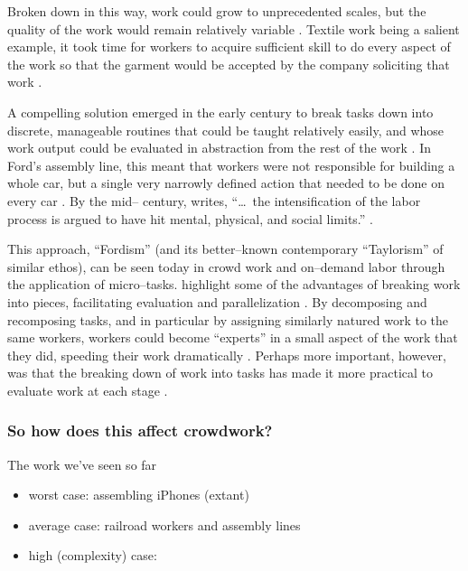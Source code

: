 \documentclass[trackingWork]{subfiles}
\begin{document}
Broken down in this way, work could grow to unprecedented scales,
but the quality of the work would remain relatively variable
\cite{murray1983decentralisation}.
Textile work being a salient example,
it took time for workers to acquire sufficient skill
to do every aspect of the work so that the garment would be accepted by the company soliciting that work
\cite{vezina1992light}.

A compelling solution emerged in the early  century to break tasks down into discrete,
manageable routines that could be taught relatively easily,
and whose work output could be evaluated in abstraction from the rest of the work
\cite{restructuringPieceworkBaker}.
In Ford's assembly line, this meant that workers were not responsible for building a whole car,
but a single very narrowly defined action that needed to be done on every car
\cite{towardsGlobalFordism}.
By the mid-- century, \citeauthor{schoenberger1988fordism} writes,
``\dots~the intensification of the labor process is argued to have hit mental, physical, and social limits.''
\cite{schoenberger1988fordism}.

This approach, ``Fordism'' (and its better--known contemporary ``Taylorism'' of similar ethos),
can be seen today in crowd work and on--demand labor through the application of micro--tasks.
\citeauthor{writingMicroTasks} highlight some of the advantages of breaking work into pieces,
facilitating evaluation and parallelization
\cite{writingMicroTasks}.
By decomposing and recomposing tasks,
and in particular by assigning similarly natured work to the same workers,
workers could become ``experts'' in a small aspect of the work that they did,
speeding their work dramatically
\cite{delayAndOrderLasecki}.
Perhaps more important, however, was that
the breaking down of work into tasks has made it more practical to evaluate work at each stage
\cite{rogstadius2011assessment}.

\subsubsection{So how does this affect crowdwork?}
The work we've seen so far 
\begin{itemize}
  \item worst case: assembling iPhones (extant)
  \item average case: railroad workers and assembly lines
  \item high (complexity) case: 
\end{itemize}
\end{document}
